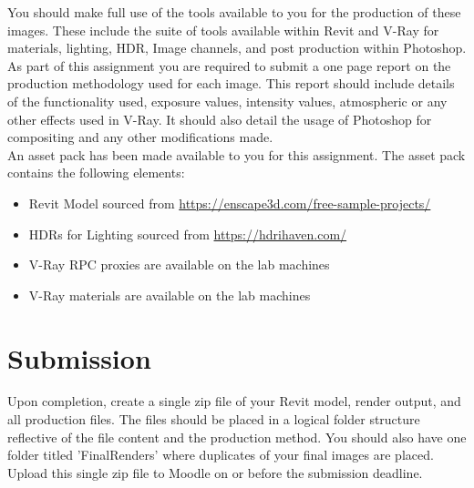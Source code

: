 You should make full use of the tools available to you for the production of these images.  These include the suite of tools available within Revit and V-Ray for materials, lighting, HDR, Image channels, and post production within Photoshop.\\

As part of this assignment you are required to submit a one page report on the production methodology used for each image.  This report should include details of the functionality used, exposure values, intensity values, atmospheric or any other effects used in V-Ray.  It should also detail the usage of Photoshop for compositing and any other modifications made. \\

An asset pack has been made available to you for this assignment.  The asset pack contains the following elements:

\begin{itemize}
	\item Revit Model sourced from \href{https://enscape3d.com/free-sample-projects/}{https://enscape3d.com/free-sample-projects/}
	\item HDRs for Lighting sourced from \href{https://hdrihaven.com/}{https://hdrihaven.com/}
	\item V-Ray RPC proxies are available on the lab machines
	\item V-Ray materials are available on the lab machines
	
\end{itemize}



\section*{Submission}
Upon completion, create a single zip file of your Revit model, render output, and all production files.  The files should be placed in a logical folder structure reflective of the file content and the production method.  You should also have one folder titled 'FinalRenders' where duplicates of your final images are placed.  Upload this single zip file to Moodle on or before the submission deadline.









